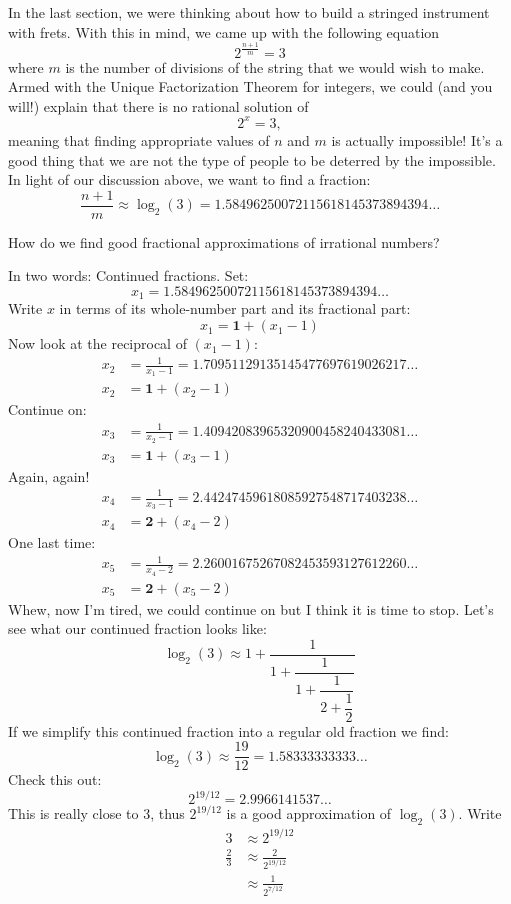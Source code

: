 In the last section, we were thinking about how to build a stringed
instrument with frets. With this in mind, we came up with the
following equation
\[
2^{\frac{n+1}{m}} = 3
\]
where $m$ is the number of divisions of the string that we would wish
to make. Armed with the Unique Factorization Theorem for
integers, we could (and you will!)
explain that there is no rational solution of
\[
2^x = 3,
\]
meaning that  finding appropriate values of $n$ and $m$ is
actually impossible! It's a good thing that we are not the type of
people to be deterred by the impossible. In light of our discussion
above, we want to find a fraction:
\[
\frac{n+1}{m} \approx \log_2(3) = 1.58496250072115618145373894394\dots
\]

\begin{ques} 
How do we find good fractional approximations of irrational numbers?
\end{ques}

In two words: Continued fractions. Set:
\[
x_1 = 1.58496250072115618145373894394\dots
\]
Write $x$ in terms of its whole-number part and its fractional part:
\[
x_1 = \mathbf{1} + (x_1-1)
\]
Now look at the reciprocal of $(x_1-1)$:
\begin{align*}
x_2 &=\frac{1}{x_1-1} = 1.70951129135145477697619026217\dots\\
x_2 &= \mathbf{1} + (x_2-1)
\end{align*}
Continue on:
\begin{align*}
x_3 &=\frac{1}{x_2-1} = 1.40942083965320900458240433081\dots\\
x_3 &= \mathbf{1} + (x_3-1)
\end{align*}
Again, again!
\begin{align*}
x_4 &=\frac{1}{x_3-1} = 2.44247459618085927548717403238\dots\\
x_4 &= \mathbf{2} + (x_4-2)
\end{align*}
One last time:
\begin{align*}
x_5 &=\frac{1}{x_4-2} = 2.26001675267082453593127612260\dots\\
x_5 &= \mathbf{2} + (x_5-2)
\end{align*}
Whew, now I'm tired, we could continue on but I think it is time to
stop. Let's see what our continued fraction looks like:
\[
\log_2(3) \approx 1 + \dfrac{1}{1+\dfrac{1}{1 + \dfrac{1}{2 + \dfrac{1}{2}}}}
\]
If we simplify this continued fraction into a regular old fraction we find:
\[
\log_2(3) \approx \frac{19}{12} = 1.58333333333\dots
\]
Check this out:
\[
2^{19/12} = 2.9966141537\dots
\]
This is really close to $3$, thus $2^{19/12}$ is a good approximation
of $\log_2(3)$. Write
\begin{align*}
3&\approx 2^{19/12} \\
\frac{2}{3} &\approx \frac{2}{2^{19/12}} \\
&\approx \frac{1}{2^{7/12}}
\end{align*}




